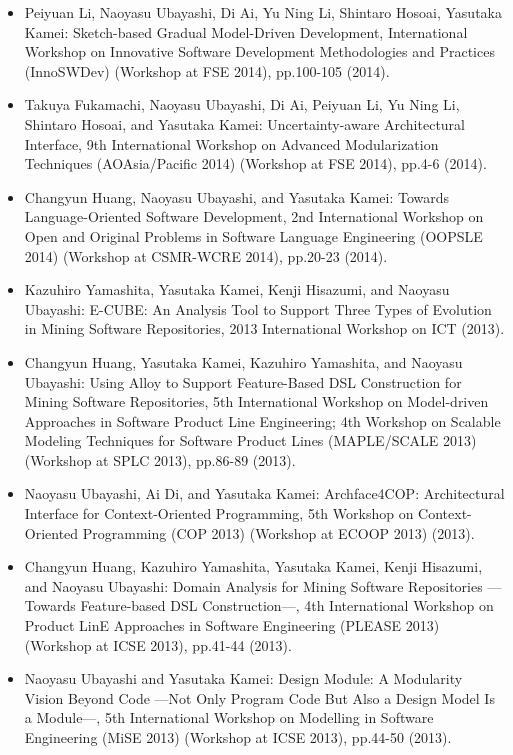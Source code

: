 \documentclass{jarticle}
\begin{document}
\begin{itemize}
\item Peiyuan Li, Naoyasu Ubayashi, Di Ai, Yu Ning Li, Shintaro Hosoai, Yasutaka Kamei:
Sketch-based Gradual Model-Driven Development,
International Workshop on Innovative Software Development Methodologies and Practices (InnoSWDev) (Workshop at FSE 2014), pp.100-105 (2014).

\item Takuya Fukamachi, Naoyasu Ubayashi, Di Ai, Peiyuan Li, Yu Ning Li, Shintaro Hosoai, and Yasutaka Kamei:
Uncertainty-aware Architectural Interface,
9th International Workshop on Advanced Modularization Techniques (AOAsia/Pacific 2014)  (Workshop at FSE 2014), pp.4-6 (2014).

\item Changyun Huang, Naoyasu Ubayashi, and Yasutaka Kamei:
Towards Language-Oriented Software Development,
2nd International Workshop on Open and Original Problems in Software Language Engineering (OOPSLE 2014) (Workshop at CSMR-WCRE 2014), pp.20-23 (2014).

\item Kazuhiro Yamashita, Yasutaka Kamei, Kenji Hisazumi, and Naoyasu Ubayashi:
E-CUBE: An Analysis Tool to Support Three Types of Evolution in Mining Software Repositories,
2013 International Workshop on ICT (2013).

\item Changyun Huang, Yasutaka Kamei, Kazuhiro Yamashita, and Naoyasu Ubayashi:
Using Alloy to Support Feature-Based DSL Construction for Mining Software Repositories,
5th International Workshop on Model-driven Approaches in Software Product Line Engineering; 4th Workshop on Scalable Modeling Techniques for Software Product Lines (MAPLE/SCALE 2013)  (Workshop at SPLC 2013), pp.86-89 (2013).

\item Naoyasu Ubayashi, Ai Di, and Yasutaka Kamei:
Archface4COP: Architectural Interface for Context-Oriented Programming,
5th Workshop on Context-Oriented Programming (COP 2013) (Workshop at ECOOP 2013) (2013).

\item Changyun Huang, Kazuhiro Yamashita, Yasutaka Kamei, Kenji Hisazumi, and Naoyasu Ubayashi:
Domain Analysis for Mining Software Repositories ---Towards Feature-based DSL Construction---,
4th International Workshop on Product LinE Approaches in Software Engineering (PLEASE 2013) (Workshop at ICSE 2013), pp.41-44 (2013).

\item Naoyasu Ubayashi and Yasutaka Kamei:
Design Module: A Modularity Vision Beyond Code ---Not Only Program Code But Also a Design Model Is a Module---,
5th International Workshop on Modelling in Software Engineering (MiSE 2013) (Workshop at ICSE 2013), pp.44-50 (2013).


\end{itemize}
\end{document}
